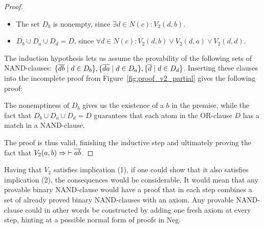\begin{proof}
  \begin{itemize}
    \item The set $D_b$ is nonempty, since $\exists d \in N(c): V_2(d,b)$.
    \item $D_b \cup D_a \cup D_d = D$, since $\forall d \in N(c): V_2(d,b) \vee V_2(d,a) \vee V_2(d,d)$.
  \end{itemize}
  The induction hypothesis lets us assume the provability of the following sets of NAND-clauses:
  $\{ \ol{db} \;|\; d \in D_b \},\{ \ol{da} \;|\; d \in D_a \},\{ \ol{d} \;|\; d \in D_d \}$.
  Inserting these clauses into the incomplete proof from Figure~\ref{fig:proof_v2_partial} gives the following proof:\par
  \begin{figure}[!h]
    \centering
    \begin{prooftree*}
    \end{prooftree*}
    \caption{}
    \label{fig:proof_v2}
  \end{figure}
  The nonemptiness of $D_b$ gives us the existence of a $b$ in the premise, while the fact that $D_b \cup D_a \cup D_d = D$ guarantees that each atom in the OR-clause $D$ has a match in a NAND-clause.

  The proof is thus valid, finishing the inductive step and ultimately proving the fact that $V_2(a,b) \Rightarrow \;\vdash \ol{ab}$.
\end{proof}
Having that $V_2$ satisfies implication (1), if one could show that it also satisfies implication (2), the consequences would be considerable.
It would mean that any provable binary NAND-clause would have a proof that in each step combines a set of already proved binary NAND-clauses with an axiom.
Any provable NAND-clause could in other words be constructed by adding one fresh axiom at every step, hinting at a possible normal form of proofs in Neg.

